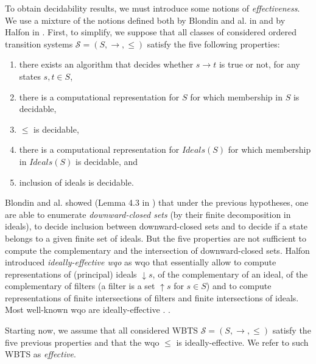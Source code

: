 \documentclass[runningheads]{llncs}
\begin{document}
To obtain decidability results, we must introduce some notions of \emph{effectiveness}. We use a mixture of the notions defined both by Blondin and al. in \cite{DBLP:journals/lmcs/BlondinFM17} and by Halfon in \cite{DBLP:phd/hal/Halfon18}.
First, to simplify, we suppose that all classes of considered ordered transition systems $\mathscr{S}=(S, \rightarrow, \leq)$ satisfy the five following properties:
\begin{enumerate}
\item there exists an algorithm that decides whether $s \rightarrow t$ is true or not, for any states $s,t \in S$,
%
\item there is a computational representation for $S$ for which membership in $S$ is decidable,
%
\item $\leq$ is decidable,
\item there is a computational representation for $Ideals(S)$ for which membership in $Ideals(S)$ is decidable, and
\item  inclusion of ideals is decidable. 
\end{enumerate}
%
Blondin and al. showed (Lemma 4.3 in \cite{DBLP:journals/lmcs/BlondinFM17}) that under the previous hypotheses, one are able to enumerate \emph{downward-closed sets} (by their finite decomposition in ideals), to decide inclusion between downward-closed sets and to decide if a state belongs to a given finite set of ideals. But the five properties are not sufficient to compute the complementary and the intersection of downward-closed sets.
%
Halfon introduced \emph{ideally-effective wqo} as wqo that essentially allow to compute representations of (principal) ideals $\mathop{\downarrow} s$, of the complementary of an ideal, of the complementary of filters (a filter is a set $\mathop{\uparrow} s$ for $s \in S$) and to compute representations of finite intersections of filters and finite intersections of ideals. Most well-known wqo are ideally-effective . \cite{DBLP:phd/hal/Halfon18}.

%
Starting now, we assume that all considered WBTS $\mathscr{S}=(S, \rightarrow, \leq)$ satisfy the five previous properties and that the wqo $\leq$ is ideally-effective. We refer to such WBTS as \emph{effective}.
\end{document}

